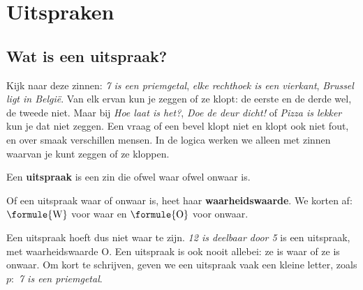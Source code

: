 \begin{oefeningen}[Start]

\end{oefeningen}


\section{Uitspraken}

\subsection{Wat is een uitspraak?}

Kijk naar deze zinnen: \textit{7 is een priemgetal}, \textit{elke rechthoek is een vierkant}, \textit{Brussel ligt in België}. Van elk ervan kun je zeggen of ze klopt: de eerste en de derde wel, de tweede niet. Maar bij \textit{Hoe laat is het?}, \textit{Doe de deur dicht!} of \textit{Pizza is lekker} kun je dat niet zeggen. Een vraag of een bevel klopt niet en klopt ook niet fout, en over smaak verschillen mensen. In de logica werken we alleen met zinnen waarvan je kunt zeggen of ze kloppen.

\begin{theorie}
Een \textbf{\textcolor{accent}{uitspraak}} is een zin die ofwel waar ofwel onwaar is.

\vspace{1mm}
Of een uitspraak waar of onwaar is, heet haar \textbf{\textcolor{accent}{waarheidswaarde}}. We korten af: $\formule{\text{W}}$ voor waar en $\formule{\text{O}}$ voor onwaar.
\end{theorie}

Een uitspraak hoeft dus niet waar te zijn. \textit{12 is deelbaar door 5} is een uitspraak, met waarheidswaarde O. Een uitspraak is ook nooit allebei: ze is waar of ze is onwaar. Om kort te schrijven, geven we een uitspraak vaak een kleine letter, zoals $p$:~\textit{7 is een priemgetal}.

